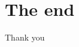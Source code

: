 \documentclass{beamer}
\begin{document}
\section{The end}
\begin{frame}
\Huge{\centerline{Thank you}}
\end{frame}

\end{document}
